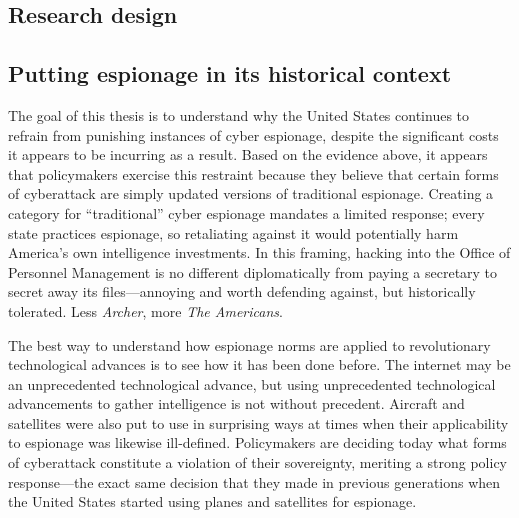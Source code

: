 \documentclass{memoir}
\begin{document}
\begin{refsegment}


\section{Research design}
\subsection{Putting espionage in its historical context}
The goal of this thesis is to understand why the United States continues to refrain from punishing instances of cyber espionage, despite the significant costs it appears to be incurring as a result. Based on the evidence above, it appears that policymakers exercise this restraint because they believe that certain forms of cyberattack are simply updated versions of traditional espionage. Creating a category for ``traditional'' cyber espionage  mandates a limited response; every state practices espionage, so retaliating against it would potentially harm America's own intelligence investments. In this framing, hacking into the Office of Personnel Management is no different diplomatically from paying a secretary to secret away its files---annoying and worth defending against, but historically tolerated. Less \emph{Archer}, more \emph{The Americans}.

The best way to understand how espionage norms are applied to revolutionary technological advances is to see how it has been done before. The internet may be an unprecedented technological advance, but using unprecedented technological advancements to gather intelligence is not without precedent. Aircraft and satellites were also put to use in surprising ways at times when their applicability to espionage was likewise ill-defined. Policymakers are deciding today what forms of cyberattack constitute a violation of their sovereignty, meriting a strong policy response---the exact same decision that they made in previous generations when the United States started using planes and satellites for espionage.


\end{refsegment}
\end{document}
